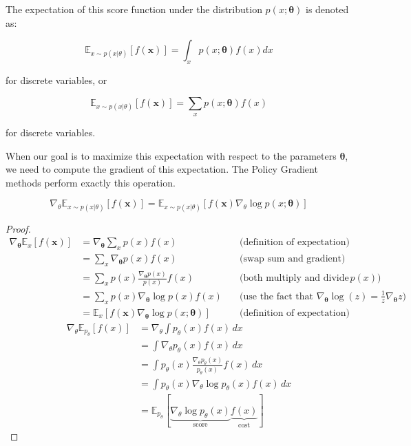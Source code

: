 The expectation of this score function under the distribution $p(x; \boldsymbol{\theta})$ is denoted as: 

\begin{equation}
\mathbb{E}_{x \sim p(x|\theta)}[f(\boldsymbol{x})] = \int_x p(x; \boldsymbol{\theta}) f(x) dx 
\end{equation}

for discrete variables, or 

\begin{equation}
\mathbb{E}_{x \sim p(x|\theta)}[f(\boldsymbol{x})] = \sum_x p(x; \boldsymbol{\theta}) f(x) 
\end{equation}

for discrete variables.

When our goal is to maximize this expectation with respect to the parameters $\boldsymbol{\theta}$, we need to compute the gradient of this expectation. The Policy Gradient methods perform exactly this operation.


\begin{equation}
\nabla_\theta \mathbb{E}_{x \sim p(x|\theta)}[f(\boldsymbol{x})] = \mathbb{E}_{x \sim p(x|\theta)}[f(\boldsymbol{x})\nabla_\theta \log p(x; \boldsymbol{\theta})]
\end{equation}
\begin{proof}
    \begin{align*}
    \nabla_{\boldsymbol{\theta}} \mathbb{E}_{x}[f(\boldsymbol{x})] & = \nabla_{\boldsymbol{\theta}} \sum_{x} p(x) f(x) \quad & \text{(definition of expectation)} \\
    & = \sum_{x} \nabla_{\boldsymbol{\theta}} p(x) f(x) \quad & \text{(swap sum and gradient)} \\
    & = \sum_{x} p(x) \frac{\nabla_{\boldsymbol{\theta}} p(x)}{p(x)} f(x) \quad & \text{(both multiply and divide by } p(x)) \\
    & = \sum_{x} p(x) \nabla_{\boldsymbol{\theta}} \log p(x) f(x) \quad & \text{(use the fact that } \nabla_{\boldsymbol{\theta}} \log(z) = \frac{1}{z} \nabla_{\boldsymbol{\theta}} z) \\
    & = \mathbb{E}_{x}[f(\boldsymbol{x}) \nabla_{\boldsymbol{\theta}} \log p(x;\boldsymbol{\theta})] \quad & \text{(definition of expectation)}
    \end{align*}
    \begin{align*}
    \nabla_\theta \mathbb{E}_{p_\theta} [f(x)] &= \nabla_\theta \int p_\theta(x) f(x) \, dx  \\
    &= \int \nabla_\theta p_\theta(x) f(x) \, dx \\
    &= \int p_\theta(x) \frac{\nabla_\theta p_\theta(x)}{p_\theta(x)} f(x) \, dx  \\
    &= \int p_\theta(x) \nabla_\theta \log p_\theta(x) f(x) \, dx  \\
    &= \mathbb{E}_{p_\theta} \left[ \underbrace{\nabla_\theta \log p_\theta(x)}_{\text{score}} \underbrace{f(x)}_{\text{cost}}  \right] 
    \end{align*}
\end{proof}


